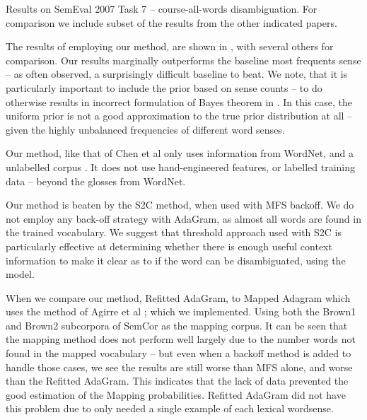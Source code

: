 \documentclass{sig-alternate}
\begin{document}
\begin{table*}
	\begin{adjustbox}{max width=\textwidth}
	\end{adjustbox}
	
	\caption{Results on SemEval 2007 Task 7 -- course-all-words disambiguation.
		For comparison we include subset of the results from the other indicated papers.
	} \label{samevalres}
\end{table*}

The results of employing our method, are shown in , with several others for comparison. Our results marginally outperforms the baseline most frequents sense -- as often observed, a surprisingly difficult baseline to beat.
We note, that it is particularly important to include the prior based on sense counts -- to do otherwise results in incorrect formulation of Bayes theorem in . In this case, the uniform prior is not a good approximation to the true prior distribution at all -- given the highly unbalanced frequencies of different word senses. 

Our method, like that of Chen et al only uses information from WordNet, and a unlabelled corpus \parencite{Chen2014}. It does not use hand-engineered features, or labelled training data -- beyond the glosses from WordNet. 

Our method is beaten by the S2C method, when used with MFS backoff.
We do not employ any back-off strategy with AdaGram, as almost all words are found in the trained vocabulary. We suggest that threshold approach used with S2C is particularly effective at determining whether there is enough useful context information to make it clear as to if the word can be disambiguated, using the model.


When we compare our method, Refitted AdaGram, to Mapped Adagram which uses the method of Agirre et al \parencite{agirre2006}; which we implemented. Using both the Brown1 and Brown2 subcorpora of SemCor as the mapping corpus.
It can be seen that the mapping method does not perform well largely due to the number words not found in the mapped vocabulary -- but even when a backoff method is added to handle those cases, we see the results are still worse than MFS alone, and worse than the Refitted AdaGram. This indicates that the lack of data prevented the good estimation of the Mapping probabilities. Refitted AdaGram did not have this problem due to only needed a single example of each lexical wordsense.
\end{document}
